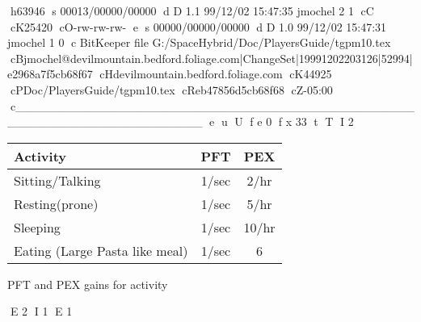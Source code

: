 h63946
s 00013/00000/00000
d D 1.1 99/12/02 15:47:35 jmochel 2 1
cC
cK25420
cO-rw-rw-rw-
e
s 00000/00000/00000
d D 1.0 99/12/02 15:47:31 jmochel 1 0
c BitKeeper file G:/SpaceHybrid/Doc/PlayersGuide/tgpm10.tex
cBjmochel@devilmountain.bedford.foliage.com|ChangeSet|19991202203126|52994|e2968a7f5cb68f67
cHdevilmountain.bedford.foliage.com
cK44925
cPDoc/PlayersGuide/tgpm10.tex
cReb47856d5cb68f68
cZ-05:00
c______________________________________________________________________
e
u
U
f e 0
f x 33
t
T
I 2
\begin{SHTable}
	\begin{tabular}{lcc}
	Activity		&	PFT & PEX \\	
\hline
	Sitting/Talking	&	1/sec	& 2/hr \\
	Resting(prone)	&	1/sec	& 5/hr \\
	Sleeping		&	1/sec	& 10/hr \\
	Eating (Large Pasta like meal) 	 & 1/sec & 6 \\
    \end{tabular}
    \caption{PFT and PEX gains for activity}
\end{SHTable}
E 2
I 1
E 1

